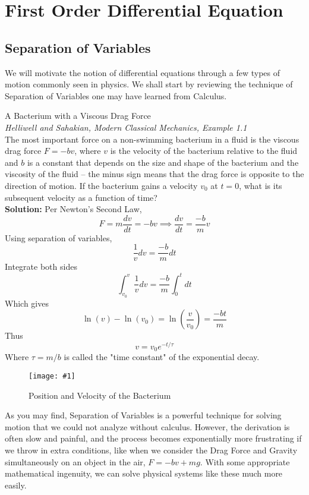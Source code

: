 \documentclass[11pt]{article}
\newcommand{\fig}[4]{
    \begin{figure}[H]
        \centering
        \texttt{[image: \#1]}
        \caption{#2}
        \label{exp4fit}
    \end{figure}
}
\theoremstyle{gangnamstyle}{\newtheorem{definition}{Definition}[]}
\theoremstyle{gangnamstyle}{\newtheorem{example}{Example}[]}
\theoremstyle{gangnamstyle}{\newtheorem{problem}{Problem}[]}
\theoremstyle{gangnamstyle}{\newtheorem{warning}{Warning}[]}
\begin{document}

\section{First Order Differential Equation}
\subsection{Separation of Variables}

We will motivate the notion of differential equations through a few types of motion commonly seen in physics. We shall start by reviewing the technique of Separation of Variables one may have learned from Calculus. 

\begin{example}
A Bacterium with a Viscous Drag Force \\
\textit{Helliwell and Sahakian, Modern Classical Mechanics, Example 1.1} \\
The most important force on a non-swimming bacterium in a fluid is the viscous drag force $F = -bv$, where $v$ is the velocity of the bacterium relative to the fluid and $b$ is a constant that depends on the size and shape of the bacterium and the viscosity of the fluid – the minus sign means that the drag force is opposite to the direction of motion. If the bacterium gains a velocity $v_0$ at $t = 0$, what is its subsequent velocity as a function of time? \\

\textbf{Solution:} Per Newton's Second Law, 
\[ F = m\frac{dv}{dt} = -bv \implies \frac{dv}{dt} = \frac{-b}{m}v \]
Using separation of variables,
\[ \frac{1}{v}dv = \frac{-b}{m}dt \]
Integrate both sides
\[ \int_{v_0}^v \frac{1}{v}dv = \frac{-b}{m} \int_0^t dt \]
Which gives
\[ \ln(v) - \ln(v_0) = \ln(\frac{v}{v_0}) = \frac{-bt}{m} \]
Thus
\[ v = v_0e^{-t / \tau} \]
Where $\tau = m/b$ is called the "time constant" of the exponential decay. 

\fig{figs/n1/exp.jpg}{Position and Velocity of the Bacterium}{0.4}{0}
\end{example}

As you may find, Separation of Variables is a powerful technique for solving motion that we could not analyze without calculus. However, the derivation is often slow and painful, and the process becomes exponentially more frustrating if we throw in extra conditions, like when we consider the Drag Force and Gravity simultaneously on an object in the air, $F = -bv + mg$. With some appropriate mathematical ingenuity, we can solve physical systems like these much more easily. 
\end{document}
